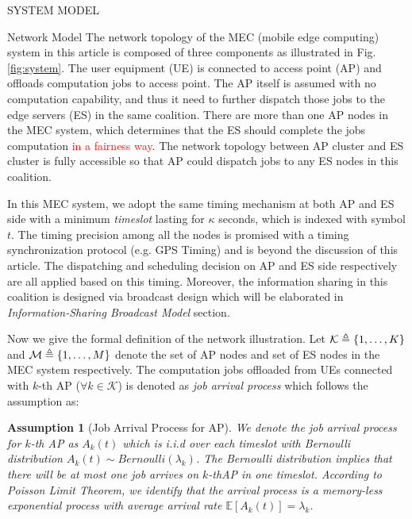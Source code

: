 \documentclass[10pt, conference, letterpaper]{IEEEtran}
\newtheorem{assumption}{Assumption}
\newcommand{\define}{\triangleq}
\DeclarePairedDelimiter{\set}{\{}{\}}
\newcommand{\apSet}{\mathcal{K}}
\begin{document}
    \begin{section}{SYSTEM MODEL}
        \label{sec:model}
        \begin{subsection}{Network Model}
            The network topology of the MEC (mobile edge computing) system in this article is composed of three components as illustrated in Fig. \ref{fig:system}.
            The user equipment (UE) is connected to access point (AP) and offloads computation jobs to access point. The AP itself is assumed with no computation capability, and thus it need to further dispatch those jobs to the edge servers (ES) in the same coalition. There are more than one AP nodes in the MEC system, which determines that the ES should complete the jobs computation \textcolor{red}{in a fairness way}. The network topology between AP cluster and ES cluster is fully accessible so that AP could dispatch jobs to any ES nodes in this coalition.

            In this MEC system, we adopt the same timing mechanism at both AP and ES side with a minimum \emph{timeslot} lasting for $\kappa$ seconds, which is indexed with symbol $t$. The timing precision among all the nodes is promised with a timing synchronization protocol (e.g. GPS Timing) and is beyond the discussion of this article. The dispatching and scheduling decision on AP and ES side respectively are all applied based on this timing. Moreover, the information sharing in this coalition is designed via broadcast design which will be elaborated in \emph{Information-Sharing Broadcast Model} section.

            Now we give the formal definition of the network illustration. Let $\apSet \define \set{1,\dots,K}$ and $\mathcal{M} \define \set{1,\dots,M}$ denote the set of AP nodes and set of ES nodes in the MEC system respectively. The computation jobs offloaded from UEs connected with $k$-th AP ($\forall k\in\apSet$) is denoted as \emph{job arrival process} which follows the assumption as:
            \begin{assumption}[Job Arrival Process for AP]
                We denote the job arrival process for $k$-th AP as $A_k(t)$ which is i.i.d over each timeslot with Bernoulli distribution $A_k(t) \sim Bernoulli(\lambda_k)$. The Bernoulli distribution implies that there will be at most one job arrives on $k$-thAP in one timeslot. According to Poisson Limit Theorem, we identify that the arrival process is a memory-less exponential process with average arrival rate $\mathbb{E}[A_k(t)] = \lambda_k$.
            \end{assumption}
            

\end{subsection}
\end{section}
\end{document}
